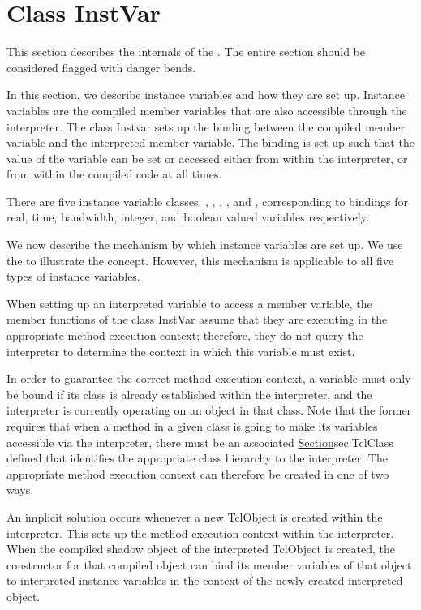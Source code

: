 \documentclass{article}
\begin{document}
\section{Class InstVar}
\label{sec:InstVar}

\danger
This section describes the internals of the .
The entire section should be considered flagged with danger bends.

In this section, we describe instance variables and how they are set up.
Instance variables are the compiled member
variables that are also accessible through the interpreter.
The class Instvar sets up the binding
between the compiled member variable and the interpreted member variable.
The binding is set up such that the value of the variable can be
set or accessed either from within the interpreter, or from
within the compiled code at all times.

There are five instance variable classes:
,
,
,
,
and ,
corresponding to bindings for real, time, bandwidth, integer, and
boolean valued variables respectively.

We now describe the mechanism by which instance variables are set up.
We use the 
to illustrate the concept.
However, this mechanism is applicable to all five types of instance variables.

When setting up an interpreted variable to access a member variable,
the member functions of the class InstVar assume that they are executing
in the appropriate method execution context;
therefore, they do not query the interpreter to determine the context in
which this variable must exist.

In order to guarantee the correct method execution context,
a variable must only be bound if its class is already established within
the interpreter, and
the interpreter is currently operating on an object in that class.
Note that the former requires that when a method in a given class is
going to make its variables accessible via the interpreter,
there must be an associated 
\href{class TclClass}{Section}{sec:TclClass}
defined that identifies the appropriate class hierarchy to the interpreter.
The appropriate method execution context can therefore be created in one
of two ways.

An implicit solution occurs whenever a new TclObject is created within
the interpreter.
This sets up the method execution context within the interpreter.
When the compiled shadow object of the interpreted TclObject is created,
the constructor for that compiled object can bind its member variables
of that object
to interpreted instance variables in the context of the newly created
interpreted object.
\end{document}
